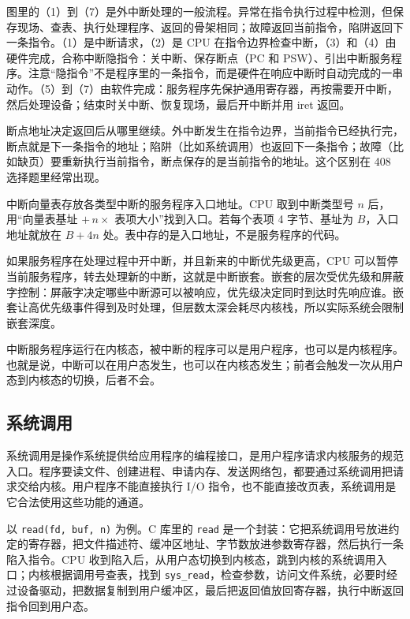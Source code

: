 图里的（1）到（7）是外中断处理的一般流程。异常在指令执行过程中检测，但保存现场、查表、执行处理程序、返回的骨架相同；故障返回当前指令，陷阱返回下一条指令。（1）是中断请求，（2）是 CPU 在指令边界检查中断，（3）和（4）由硬件完成，合称中断隐指令：关中断、保存断点（PC 和 PSW）、引出中断服务程序。注意“隐指令”不是程序里的一条指令，而是硬件在响应中断时自动完成的一串动作。（5）到（7）由软件完成：服务程序先保护通用寄存器，再按需要开中断，然后处理设备；结束时关中断、恢复现场，最后开中断并用 iret 返回。

断点地址决定返回后从哪里继续。外中断发生在指令边界，当前指令已经执行完，断点就是下一条指令的地址；陷阱（比如系统调用）也返回下一条指令；故障（比如缺页）要重新执行当前指令，断点保存的是当前指令的地址。这个区别在 408 选择题里经常出现。

中断向量表存放各类型中断的服务程序入口地址。CPU 取到中断类型号 $n$ 后，用“向量表基址 $+\,n\times$ 表项大小”找到入口。若每个表项 4 字节、基址为 $B$，入口地址就放在 $B+4n$ 处。表中存的是入口地址，不是服务程序的代码。

如果服务程序在处理过程中开中断，并且新来的中断优先级更高，CPU 可以暂停当前服务程序，转去处理新的中断，这就是中断嵌套。嵌套的层次受优先级和屏蔽字控制：屏蔽字决定哪些中断源可以被响应，优先级决定同时到达时先响应谁。嵌套让高优先级事件得到及时处理，但层数太深会耗尽内核栈，所以实际系统会限制嵌套深度。

中断服务程序运行在内核态，被中断的程序可以是用户程序，也可以是内核程序。也就是说，中断可以在用户态发生，也可以在内核态发生；前者会触发一次从用户态到内核态的切换，后者不会。

\subsection{系统调用}

系统调用是操作系统提供给应用程序的编程接口，是用户程序请求内核服务的规范入口。程序要读文件、创建进程、申请内存、发送网络包，都要通过系统调用把请求交给内核。用户程序不能直接执行 I/O 指令，也不能直接改页表，系统调用是它合法使用这些功能的通道。

以 \texttt{read(fd, buf, n)} 为例。C 库里的 \texttt{read} 是一个封装：它把系统调用号放进约定的寄存器，把文件描述符、缓冲区地址、字节数放进参数寄存器，然后执行一条陷入指令。CPU 收到陷入后，从用户态切换到内核态，跳到内核的系统调用入口；内核根据调用号查表，找到 \texttt{sys\_read}，检查参数，访问文件系统，必要时经过设备驱动，把数据复制到用户缓冲区，最后把返回值放回寄存器，执行中断返回指令回到用户态。

